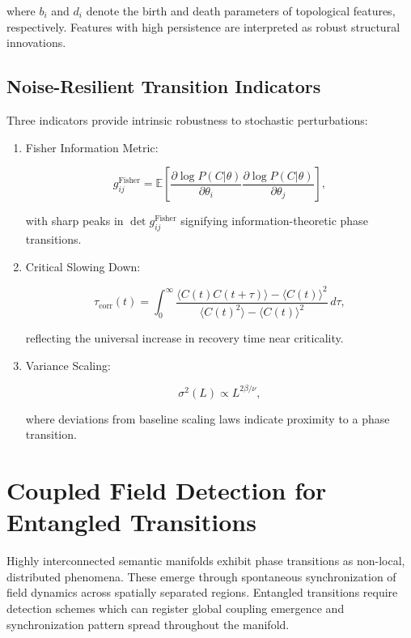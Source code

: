 where \(b_i\) and \(d_i\) denote the birth and death parameters of topological features, respectively. Features with high persistence are interpreted as robust structural innovations.

\subsection{Noise-Resilient Transition Indicators}

Three indicators provide intrinsic robustness to stochastic perturbations:

\begin{enumerate}
    \item Fisher Information Metric:

    \begin{equation}
    g_{ij}^{\text{Fisher}} = \mathbb{E}\left[\frac{\partial \log P(C|\theta)}{\partial \theta_i}\frac{\partial \log P(C|\theta)}{\partial \theta_j}\right],
    \end{equation}

    with sharp peaks in \(\det g_{ij}^{\text{Fisher}}\) signifying information-theoretic phase transitions.

    \item Critical Slowing Down:

    \begin{equation}
    \tau_{\text{corr}}(t) = \int_0^{\infty} \frac{\langle C(t)C(t+\tau) \rangle - \langle C(t) \rangle^2}{\langle C(t)^2 \rangle - \langle C(t) \rangle^2} \, d\tau,
    \end{equation}

    reflecting the universal increase in recovery time near criticality.

    \item Variance Scaling:

    \begin{equation}
    \sigma^2(L) \propto L^{2\beta/\nu},
    \end{equation}

    where deviations from baseline scaling laws indicate proximity to a phase transition.
\end{enumerate}

\section{Coupled Field Detection for Entangled Transitions}

Highly interconnected semantic manifolds exhibit phase transitions as non-local, distributed phenomena. These emerge through spontaneous synchronization of field dynamics across spatially separated regions. Entangled transitions require detection schemes which can register global coupling emergence and synchronization pattern spread throughout the manifold.

